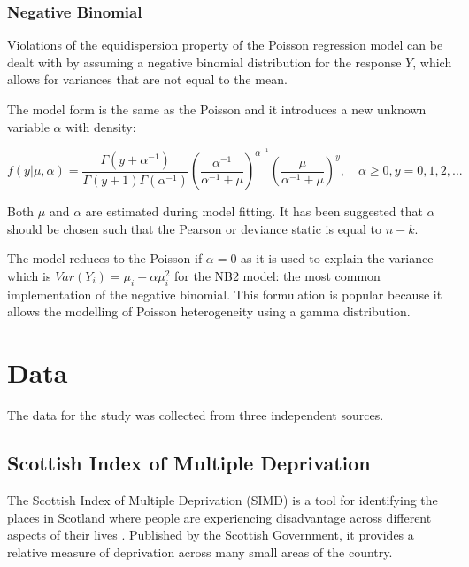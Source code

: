 \documentclass{thesis}
\begin{document}
\subsection{Negative Binomial}

Violations of the equidispersion property of the Poisson regression model can be dealt with by assuming a negative binomial distribution for the response $Y$, which allows for variances that are not equal to the mean.

The model form is the same as the Poisson and it introduces a new unknown variable $\alpha$ with density:

\begin{equation}
    f(y|\mu,\alpha) = \frac{\Gamma(y + \alpha^{-1})}{\Gamma(y+1)\Gamma(\alpha^{-1})}(\frac{\alpha^{-1}}{\alpha^{-1} + \mu})^{\alpha^{-1}}(\frac{\mu}{\alpha^{-1} + \mu})^y,\hspace{1em}\alpha\ge 0, y=0,1,2,...
\end{equation}

Both $\mu$ and $\alpha$ are estimated during model fitting. It has been suggested that $\alpha$ should be chosen such that the Pearson or deviance static is equal to $n - k$\cite{cameron_trivedi_2013}.

The model reduces to the Poisson if $\alpha = 0$ as it is used to explain the variance which is $Var(Y_i) = \mu_i + \alpha\mu_i^2$ for the NB2 model: the most common implementation of the negative binomial\cite{cameron_trivedi_2013}. This formulation is popular because it allows the modelling of Poisson heterogeneity using a gamma distribution\cite{ncss-neg-bin}.


\chapter{Data}

The data for the study was collected from three independent sources.

\section{Scottish Index of Multiple Deprivation}

The Scottish Index of Multiple Deprivation (SIMD) is a tool for identifying the places in Scotland where people are experiencing disadvantage across different aspects of their lives \cite{simd}. Published by the Scottish Government, it provides a relative measure of deprivation across many small areas of the country.
\end{document}
